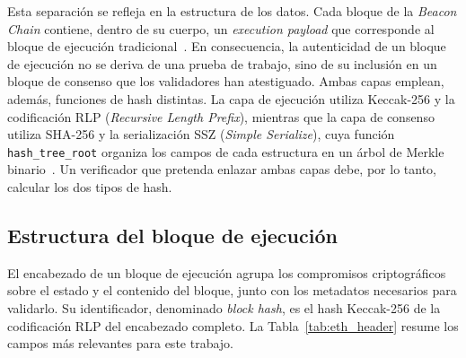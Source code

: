Esta separación se refleja en la estructura de los datos. Cada bloque de la \textit{Beacon
Chain} contiene, dentro de su cuerpo, un \textit{execution payload} que corresponde al bloque de
ejecución tradicional~\cite{ethconsensusphase0}. En consecuencia, la autenticidad de un bloque
de ejecución no se deriva de una prueba de trabajo, sino de su inclusión en un bloque de consenso
que los validadores han atestiguado. Ambas capas emplean, además, funciones de hash distintas. La
capa de ejecución utiliza Keccak-256 y la codificación RLP (\textit{Recursive Length Prefix}),
mientras que la capa de consenso utiliza SHA-256 y la serialización SSZ (\textit{Simple
Serialize}), cuya función \texttt{hash\_tree\_root} organiza los campos de cada estructura en un
árbol de Merkle binario~\cite{sszspec}. Un verificador que pretenda enlazar ambas capas debe, por
lo tanto, calcular los dos tipos de hash.

\subsection{Estructura del bloque de ejecución}
\label{sec:eth_bloque}

El encabezado de un bloque de ejecución agrupa los compromisos criptográficos sobre el estado y
el contenido del bloque, junto con los metadatos necesarios para validarlo. Su identificador,
denominado \textit{block hash}, es el hash Keccak-256 de la codificación RLP del encabezado
completo. La Tabla~\ref{tab:eth_header} resume los campos más relevantes para este trabajo.

